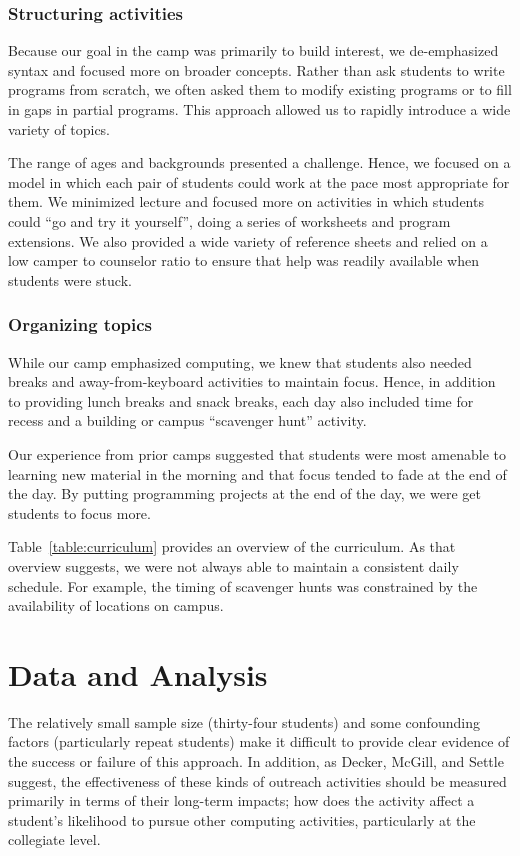 \subsubsection{Structuring activities}

Because our goal in the camp was primarily to build interest, we
de-emphasized syntax and focused more on broader concepts.  Rather
than ask students to write programs from scratch, we often asked
them to modify existing programs or to fill in gaps in partial
programs.  This approach allowed us to rapidly introduce a wide
variety of topics.

The range of ages and backgrounds presented a challenge.  Hence,
we focused on a model in which each pair of students could work at the
pace most appropriate for them.  We minimized lecture and focused more
on activities in which students could ``go and try it yourself'', doing
a series of worksheets and program extensions.  We also provided a wide
variety of reference sheets and relied on a low camper to counselor
ratio to ensure that help was readily available when students were stuck.

\subsubsection{Organizing topics}

While our camp emphasized computing, we knew that students also
needed breaks and away-from-keyboard activities to maintain focus.
Hence, in addition to providing lunch breaks and snack breaks, each
day also included time for recess and a building or campus ``scavenger
hunt'' activity.

Our experience from prior camps suggested that students were most
amenable to learning new material in the morning and that focus
tended to fade at the end of the day.  By putting programming
projects at the end of the day, we were get students to focus more.

Table~\ref{table:curriculum} provides an overview of the curriculum.
As that overview suggests, we were not always able to maintain a
consistent daily schedule.  For example, the timing of scavenger
hunts was constrained by the availability of locations on campus.

\section{Data and Analysis}

The relatively small sample size (thirty-four students) and some
confounding factors (particularly repeat students) make it difficult
to provide clear evidence of the success or failure of this approach.
In addition, as Decker, McGill, and Settle \cite{Decker2016,McGill2015}
suggest, the effectiveness of these kinds of outreach activities
should be measured primarily in terms of their long-term impacts;
how does the activity affect a student's likelihood to pursue other
computing activities, particularly at the collegiate level.

